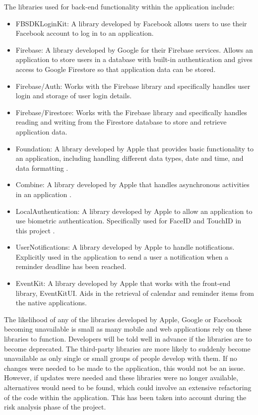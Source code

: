 	                The libraries used for back-end functionality within the application include:
	                \begin{itemize}[noitemsep]
	                    \item FBSDKLoginKit: A library developed by Facebook allows users to use their Facebook account to log in to an application.
	                    \item Firebase: A library developed by Google for their Firebase services.  Allows an application to store users in a database with built-in authentication and gives access to Google Firestore so that application data can be stored.
	                    \item Firebase/Auth: Works with the Firebase library and specifically handles user login and storage of user login details.
	                    \item Firebase/Firestore: Works with the Firebase library and specifically handles reading and writing from the Firestore database to store and retrieve application data.
	                    \item Foundation: A library developed by Apple that provides basic functionality to an application, including handling different data types, date and time, and data formatting \cite{foundation_apple}.
	                    \item Combine: A library developed by Apple that handles asynchronous activities in an application \cite{combine_apple}.
	                    \item LocalAuthentication: A library developed by Apple to allow an application to use biometric authentication.  Specifically used for FaceID and TouchID in this project \cite{local_auth_apple}.
	                    \item UserNotifications: A library developed by Apple to handle notifications.  Explicitly used in the application to send a user a notification when a reminder deadline has been reached.
	                    \item EventKit: A library developed by Apple that works with the front-end library, EventKitUI.  Aids in the retrieval of calendar and reminder items from the native applications.
	                \end{itemize}

                    The likelihood of any of the libraries developed by Apple, Google or Facebook becoming unavailable is small as many mobile and web applications rely on these libraries to function. Developers will be told well in advance if the libraries are to become deprecated.  The third-party libraries are more likely to suddenly become unavailable as only single or small groups of people develop with them.  If no changes were needed to be made to the application, this would not be an issue. However, if updates were needed and these libraries were no longer available, alternatives would need to be found, which could involve an extensive refactoring of the code within the application.  This has been taken into account during the risk analysis phase of the project.
	            
